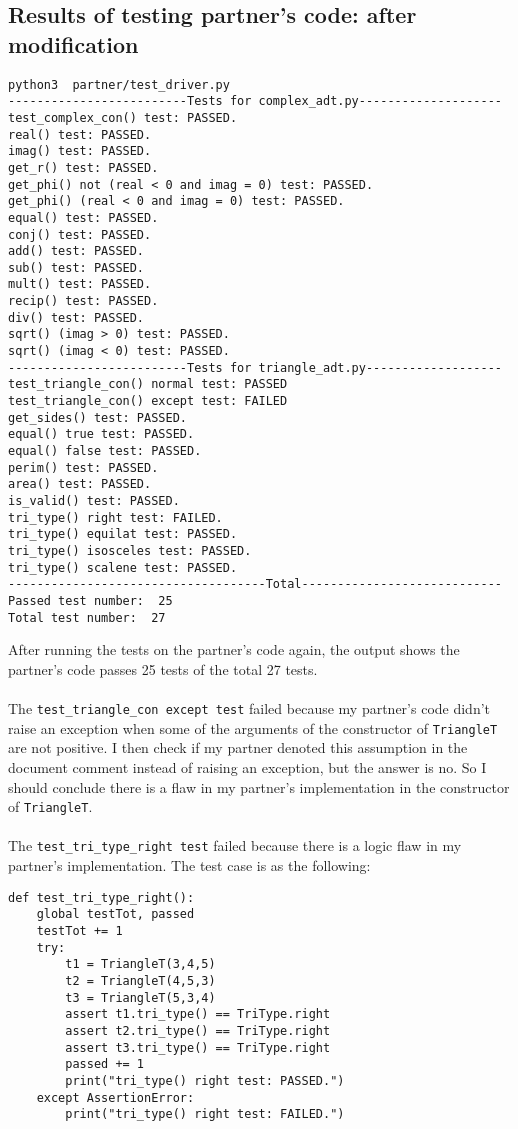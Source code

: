 \documentclass[12pt]{article}
\begin{document}
\subsection{Results of testing partner's code: after modification}
\begin{lstlisting}
python3  partner/test_driver.py
-------------------------Tests for complex_adt.py--------------------
test_complex_con() test: PASSED.
real() test: PASSED.
imag() test: PASSED.
get_r() test: PASSED.
get_phi() not (real < 0 and imag = 0) test: PASSED.
get_phi() (real < 0 and imag = 0) test: PASSED.
equal() test: PASSED.
conj() test: PASSED.
add() test: PASSED.
sub() test: PASSED.
mult() test: PASSED.
recip() test: PASSED.
div() test: PASSED.
sqrt() (imag > 0) test: PASSED.
sqrt() (imag < 0) test: PASSED.
-------------------------Tests for triangle_adt.py-------------------
test_triangle_con() normal test: PASSED
test_triangle_con() except test: FAILED
get_sides() test: PASSED.
equal() true test: PASSED.
equal() false test: PASSED.
perim() test: PASSED.
area() test: PASSED.
is_valid() test: PASSED.
tri_type() right test: FAILED.
tri_type() equilat test: PASSED.
tri_type() isosceles test: PASSED.
tri_type() scalene test: PASSED.
------------------------------------Total----------------------------
Passed test number:  25
Total test number:  27
\end{lstlisting}
After running the tests on the partner's code again, the output shows the partner's code passes 25 tests of the total 27 tests.\\\\
The \verb|test_triangle_con except test| failed because my partner's code didn't raise an exception when some of the arguments of the constructor of \verb|TriangleT| are not positive. I then check if my partner denoted this assumption in the document comment instead of raising an exception, but the answer is no. So I should conclude there is a flaw in my partner's implementation in the constructor of \verb|TriangleT|.\\\\
The \verb|test_tri_type_right test| failed because there is a logic flaw in my partner's implementation.
\lstset{language=Python, basicstyle=\ttfamily\small, breaklines=true, showspaces=false,
  showstringspaces=false, breakatwhitespace=true}
The test case is as the following:
\begin{lstlisting}
def test_tri_type_right():
	global testTot, passed
	testTot += 1
	try:
		t1 = TriangleT(3,4,5)
		t2 = TriangleT(4,5,3)
		t3 = TriangleT(5,3,4)
		assert t1.tri_type() == TriType.right
		assert t2.tri_type() == TriType.right
		assert t3.tri_type() == TriType.right
		passed += 1
		print("tri_type() right test: PASSED.")
	except AssertionError:
		print("tri_type() right test: FAILED.")
\end{lstlisting}
\end{document}
